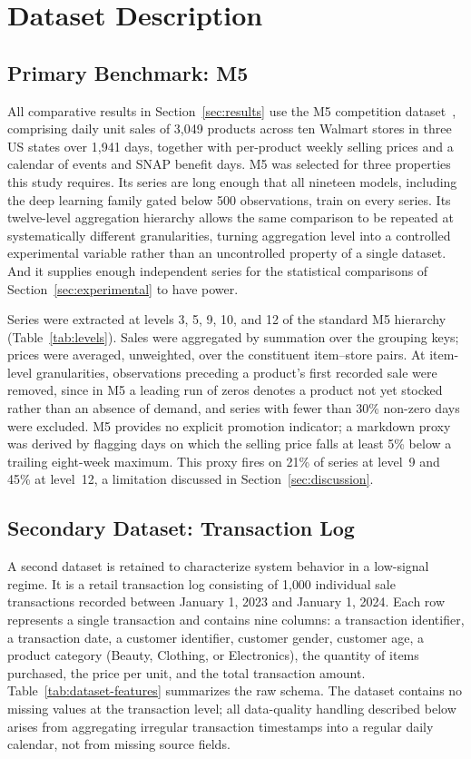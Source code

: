 \section{Dataset Description}
\label{sec:dataset}

\subsection{Primary Benchmark: M5}
All comparative results in Section~\ref{sec:results} use the M5 competition dataset~\cite{makridakis2022m5}, comprising daily unit sales of 3{,}049 products across ten Walmart stores in three US states over 1{,}941 days, together with per-product weekly selling prices and a calendar of events and SNAP benefit days. M5 was selected for three properties this study requires. Its series are long enough that all nineteen models, including the deep learning family gated below 500 observations, train on every series. Its twelve-level aggregation hierarchy allows the same comparison to be repeated at systematically different granularities, turning aggregation level into a controlled experimental variable rather than an uncontrolled property of a single dataset. And it supplies enough independent series for the statistical comparisons of Section~\ref{sec:experimental} to have power.

Series were extracted at levels 3, 5, 9, 10, and 12 of the standard M5 hierarchy (Table~\ref{tab:levels}). Sales were aggregated by summation over the grouping keys; prices were averaged, unweighted, over the constituent item--store pairs. At item-level granularities, observations preceding a product's first recorded sale were removed, since in M5 a leading run of zeros denotes a product not yet stocked rather than an absence of demand, and series with fewer than 30\% non-zero days were excluded. M5 provides no explicit promotion indicator; a markdown proxy was derived by flagging days on which the selling price falls at least 5\% below a trailing eight-week maximum. This proxy fires on 21\% of series at level~9 and 45\% at level~12, a limitation discussed in Section~\ref{sec:discussion}.

\subsection{Secondary Dataset: Transaction Log}
A second dataset is retained to characterize system behavior in a low-signal regime. It is a retail transaction log consisting of 1{,}000 individual sale transactions recorded between January 1, 2023 and January 1, 2024. Each row represents a single transaction and contains nine columns: a transaction identifier, a transaction date, a customer identifier, customer gender, customer age, a product category (Beauty, Clothing, or Electronics), the quantity of items purchased, the price per unit, and the total transaction amount. Table~\ref{tab:dataset-features} summarizes the raw schema. The dataset contains no missing values at the transaction level; all data-quality handling described below arises from aggregating irregular transaction timestamps into a regular daily calendar, not from missing source fields.

